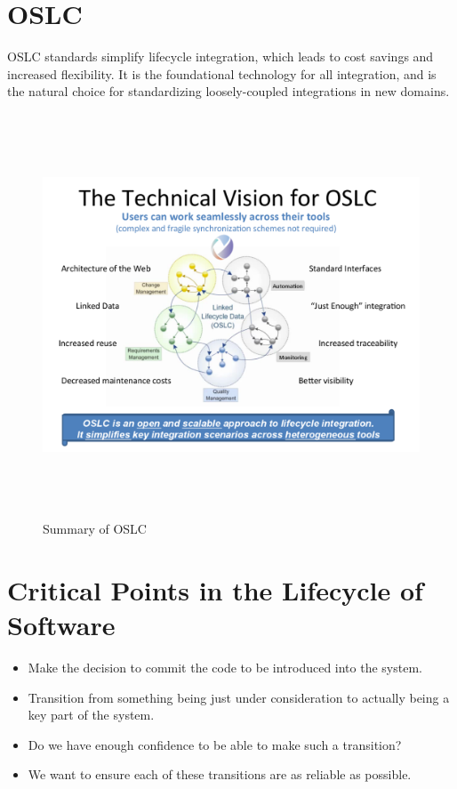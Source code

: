 \documentclass{report}
\begin{document}
\section{OSLC}
OSLC standards simplify lifecycle integration, which leads to cost savings and increased flexibility.
It is the foundational technology for all integration, and is the natural choice for standardizing loosely-coupled integrations in new domains. 

\begin{figure}[h]
\begin{center} 
    \includegraphics[scale=0.8,width = 15cm, height = 12cm]{images/OSLC.pdf}
    \caption{Summary of OSLC}
\end{center}
\end{figure}

\section{Critical Points in the Lifecycle of Software}
\begin{itemize}
\item  Make the decision to commit the code to be introduced into the system.
\item  Transition from something being just under consideration to actually being a key part of the system.
\item  Do we have enough confidence to be able to make such a transition?
\item  We want to ensure each of these transitions are as reliable as possible. 
\end{itemize}
\end{document}
